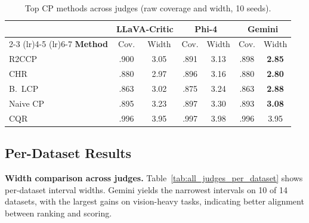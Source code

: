 \documentclass{article}
\begin{document}
\begin{table}[t]
\centering
\caption{Top CP methods across judges (raw coverage and width, 10 seeds).}
\label{tab:all_methods_all_judges}
\small
\begin{tabular}{lcccccc}
\toprule
& \multicolumn{2}{c}{\textbf{LLaVA-Critic}} & \multicolumn{2}{c}{\textbf{Phi-4}} & \multicolumn{2}{c}{\textbf{Gemini}} \\
\cmidrule(lr){2-3} \cmidrule(lr){4-5} \cmidrule(lr){6-7}
\textbf{Method} & Cov. & Width & Cov. & Width & Cov. & Width \\
\midrule
R2CCP & .900 & 3.05 & .891 & 3.13 & .898 & \textbf{2.85} \\
CHR & .880 & 2.97 & .896 & 3.16 & .880 & \textbf{2.80} \\
B.\ LCP & .863 & 3.02 & .875 & 3.24 & .863 & \textbf{2.88} \\
Naive CP & .895 & 3.23 & .897 & 3.30 & .893 & \textbf{3.08} \\
CQR & .996 & 3.95 & .997 & 3.98 & .996 & 3.95 \\
\bottomrule
\end{tabular}
\end{table}

\subsection{Per-Dataset Results}
\label{app:per_dataset_core}

\textbf{Width comparison across judges.}
Table~\ref{tab:all_judges_per_dataset} shows per-dataset interval widths. Gemini yields the narrowest intervals on 10 of 14 datasets, with the largest gains on vision-heavy tasks, indicating better alignment between ranking and scoring.
\end{document}
